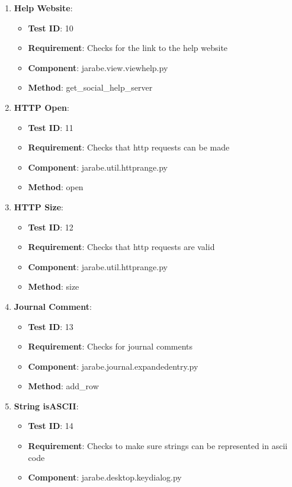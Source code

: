 \documentclass{article}
\begin{document}
\begin{enumerate}[noitemsep,topsep=0pt]
\begin{itemize}[noitemsep,topsep=0pt]
\end{itemize}
\item \textbf{Help Website}:
\begin{itemize}[noitemsep,topsep=0pt]
\item \textbf{Test ID}: 10
\item \textbf{Requirement}: Checks for the link to the help website
\item \textbf{Component}: jarabe.view.viewhelp.py
\item \textbf{Method}: get\_social\_help\_server
\end{itemize}
\item \textbf{HTTP Open}:
\begin{itemize}[noitemsep,topsep=0pt]
\item \textbf{Test ID}: 11
\item \textbf{Requirement}: Checks that http requests can be made
\item \textbf{Component}: jarabe.util.httprange.py
\item \textbf{Method}: open
\end{itemize}
\item \textbf{HTTP Size}:
\begin{itemize}[noitemsep,topsep=0pt]
\item \textbf{Test ID}: 12
\item \textbf{Requirement}: Checks that http requests are valid
\item \textbf{Component}: jarabe.util.httprange.py
\item \textbf{Method}: size
\end{itemize}
\item \textbf{Journal Comment}:
\begin{itemize}[noitemsep,topsep=0pt]
\item \textbf{Test ID}: 13
\item \textbf{Requirement}: Checks for journal comments
\item \textbf{Component}: jarabe.journal.expandedentry.py
\item \textbf{Method}: add\_row
\end{itemize}
\item \textbf{String isASCII}:
\begin{itemize}[noitemsep,topsep=0pt]
\item \textbf{Test ID}: 14
\item \textbf{Requirement}: Checks to make sure strings can be represented in ascii code
\item \textbf{Component}: jarabe.desktop.keydialog.py

\end{itemize}
\end{enumerate}
\end{document}
